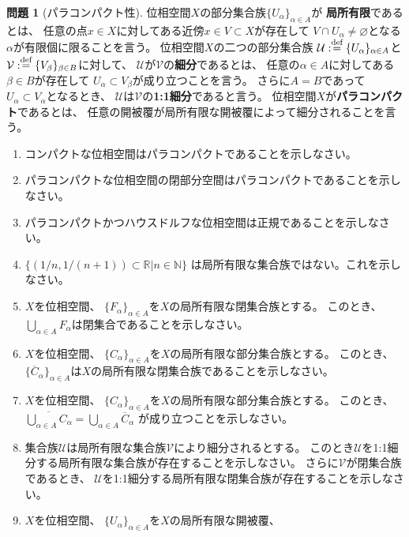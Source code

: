 \documentclass[uplatex]{jsarticle}
\theoremstyle{definition}
\newtheorem{prob}[prob]{問題}
\renewcommand{\emptyset}{\varnothing}
\newcommand{\dfn}{:\overset{\mbox{{\scriptsize def}}}{=}}
\newcommand{\R}{\mathbb{R}}
\newcommand{\N}{\mathbb{N}}
\newcommand{\mcU}{\mathcal{U}}
\newcommand{\mcV}{\mathcal{V}}
\begin{document}
\begin{prob}[パラコンパクト性]\label{paracpt}
  位相空間\(X\)の部分集合族\(\{U_{\alpha}\}_{\alpha\in A}\)が
  \textbf{局所有限}であるとは、
  任意の点\(x\in X\)に対してある近傍\(x\in V\subset X\)が存在して
  \(V\cap U_{\alpha} \neq \emptyset\)となる\(\alpha\)が有限個に限ることを言う。
  位相空間\(X\)の二つの部分集合族
  \(\mcU \dfn \{U_{\alpha}\}_{\alpha\in A}\)と
  \(\mcV \dfn \{V_{\beta}\}_{\beta\in B}\)に対して、
  \(\mcU\)が\(\mcV\)の\textbf{細分}であるとは、
  任意の\(\alpha\in A\)に対してある\(\beta\in B\)が存在して
  \(U_{\alpha}\subset V_{\beta}\)が成り立つことを言う。
  さらに\(A=B\)であって\(U_{\alpha}\subset V_{\alpha}\)となるとき、
  \(\mcU\)は\(\mcV\)の\textbf{1:1細分}であると言う。
  位相空間\(X\)が\textbf{パラコンパクト}であるとは、
  任意の開被覆が局所有限な開被覆によって細分されることを言う。
  \begin{enumerate}
    \item コンパクトな位相空間はパラコンパクトであることを示しなさい。
    \item パラコンパクトな位相空間の閉部分空間はパラコンパクトであることを示しなさい。
    \item パラコンパクトかつハウスドルフな位相空間は正規であることを示しなさい。
    \item
    \(\{(1/n,1/(n+1))\subset \R | n\in\N\}\)
    は局所有限な集合族ではない。これを示しなさい。
    \item \(X\)を位相空間、
    \(\{F_{\alpha}\}_{\alpha\in A}\)を\(X\)の局所有限な閉集合族とする。
    このとき、\(\bigcup_{\alpha\in A}F_{\alpha}\)は閉集合であることを示しなさい。
    \item \(X\)を位相空間、
    \(\{C_{\alpha}\}_{\alpha\in A}\)を\(X\)の局所有限な部分集合族とする。
    このとき、\(\{\overline{C}_{\alpha}\}_{\alpha\in A}\)は\(X\)の局所有限な閉集合族であることを示しなさい。
    \item \(X\)を位相空間、
    \(\{C_{\alpha}\}_{\alpha\in A}\)を\(X\)の局所有限な部分集合族とする。
    このとき、
    \(\overline{\bigcup_{\alpha\in A}C_{\alpha}} = \bigcup_{\alpha\in A}\overline{C}_{\alpha}\)
    が成り立つことを示しなさい。
    \item \label{1:1 refinement}
    集合族\(\mcU\)は局所有限な集合族\(\mcV\)により細分されるとする。
    このとき\(\mcU\)を1:1細分する局所有限な集合族が存在することを示しなさい。
    さらに\(\mcV\)が閉集合族であるとき、
    \(\mcU\)を1:1細分する局所有限な閉集合族が存在することを示しなさい。
    \item
    \(X\)を位相空間、
    \(\{U_{\alpha}\}_{\alpha\in A}\)を\(X\)の局所有限な開被覆、

\end{enumerate}
\end{prob}
\end{document}
